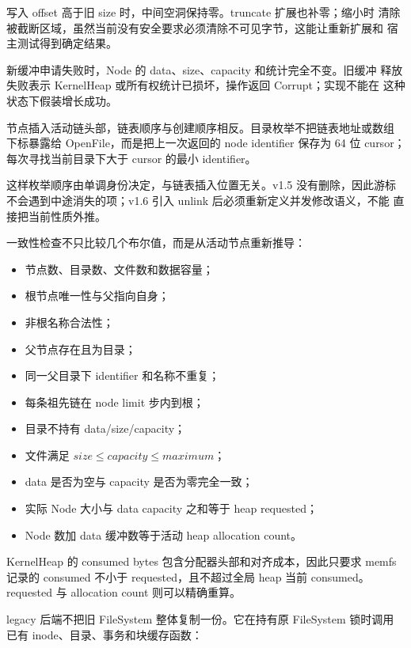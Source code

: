 写入 offset 高于旧 size 时，中间空洞保持零。truncate 扩展也补零；缩小时
清除被截断区域，虽然当前没有安全要求必须清除不可见字节，这能让重新扩展和
宿主测试得到确定结果。

\begin{failurebox}
新缓冲申请失败时，Node 的 data、size、capacity 和统计完全不变。旧缓冲
释放失败表示 KernelHeap 或所有权统计已损坏，操作返回 Corrupt；实现不能在
这种状态下假装增长成功。
\end{failurebox}

节点插入活动链头部，链表顺序与创建顺序相反。目录枚举不把链表地址或数组
下标暴露给 OpenFile，而是把上一次返回的 node identifier 保存为 64 位
cursor；每次寻找当前目录下大于 cursor 的最小 identifier。

这样枚举顺序由单调身份决定，与链表插入位置无关。v1.5 没有删除，因此游标
不会遇到中途消失的项；v1.6 引入 unlink 后必须重新定义并发修改语义，不能
直接把当前性质外推。

一致性检查不只比较几个布尔值，而是从活动节点重新推导：

\begin{itemize}
  \item 节点数、目录数、文件数和数据容量；
  \item 根节点唯一性与父指向自身；
  \item 非根名称合法性；
  \item 父节点存在且为目录；
  \item 同一父目录下 identifier 和名称不重复；
  \item 每条祖先链在 node limit 步内到根；
  \item 目录不持有 data/size/capacity；
  \item 文件满足 \(size\le capacity\le maximum\)；
  \item data 是否为空与 capacity 是否为零完全一致；
  \item 实际 Node 大小与 data capacity 之和等于 heap requested；
  \item Node 数加 data 缓冲数等于活动 heap allocation count。
\end{itemize}

KernelHeap 的 consumed bytes 包含分配器头部和对齐成本，因此只要求 memfs
记录的 consumed 不小于 requested，且不超过全局 heap 当前 consumed。
requested 与 allocation count 则可以精确重算。

legacy 后端不把旧 FileSystem 整体复制一份。它在持有原 FileSystem 锁时调用
已有 inode、目录、事务和块缓存函数：


